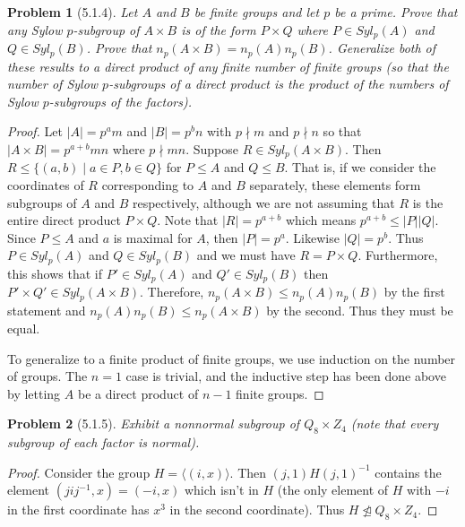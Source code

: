 \documentclass{article}
\newtheorem{problem}{Problem}
\begin{document}
\begin{problem}[5.1.4]
Let $A$ and $B$ be finite groups and let $p$ be a prime. Prove that any Sylow $p$-subgroup of $A \times B$ is of the form $P \times Q$ where $P \in Syl_p(A)$ and $Q \in Syl_p(B)$. Prove that $n_p(A \times B) = n_p(A)n_p(B)$. Generalize both of these results to a direct product of any finite number of finite groups (so that the number of Sylow $p$-subgroups of a direct product is the product of the numbers of Sylow $p$-subgroups of the factors).
\end{problem}
\begin{proof}
Let $|A| = p^am$ and $|B| = p^bn$ with $p \nmid m$ and $p \nmid n$ so that $|A \times B| = p^{a+b}mn$ where $p \nmid mn$. Suppose $R \in Syl_p(A \times B)$. Then $R \leq \{(a,b) \mid a \in P, b \in Q\}$ for $P \leq A$ and $Q \leq B$. That is, if we consider the coordinates of $R$ corresponding to $A$ and $B$ separately, these elements form subgroups of $A$ and $B$ respectively, although we are not assuming that $R$ is the entire direct product $P \times Q$. Note that $|R| = p^{a+b}$ which means $p^{a+b} \leq |P||Q|$. Since $P \leq A$ and $a$ is maximal for $A$, then $|P| = p^a$. Likewise $|Q| = p^b$. Thus $P \in Syl_p(A)$ and $Q \in Syl_p(B)$ and we must have $R = P \times Q$. Furthermore, this shows that if $P' \in Syl_p(A)$ and $Q' \in Syl_p(B)$ then $P' \times Q' \in Syl_p(A \times B)$. Therefore, $n_p(A \times B) \leq n_p(A)n_p(B)$ by the first statement and $n_p(A)n_p(B) \leq n_p(A \times B)$ by the second. Thus they must be equal.

To generalize to a finite product of finite groups, we use induction on the number of groups. The $n = 1$ case is trivial, and the inductive step has been done above by letting $A$ be a direct product of $n-1$ finite groups.
\end{proof}

\begin{problem}[5.1.5]
Exhibit a nonnormal subgroup of $Q_8 \times Z_4$ (note that every subgroup of each factor is normal).
\end{problem}
\begin{proof}
Consider the group $H = \langle (i, x) \rangle$. Then $(j, 1)H(j, 1)^{-1}$ contains the element $(jij^{-1}, x) = (-i, x)$ which isn't in $H$ (the only element of $H$ with $-i$ in the first coordinate has $x^3$ in the second coordinate). Thus $H \ntrianglelefteq Q_8 \times Z_4$.
\end{proof}
\end{document}
